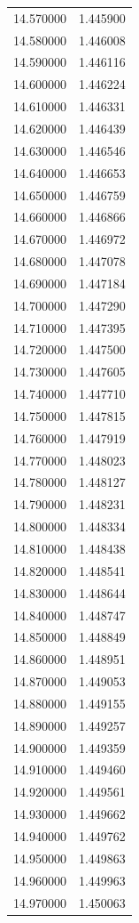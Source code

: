 \begin{tabular}{rr}
14.570000 & 1.445900 \\
14.580000 & 1.446008 \\
14.590000 & 1.446116 \\
14.600000 & 1.446224 \\
14.610000 & 1.446331 \\
14.620000 & 1.446439 \\
14.630000 & 1.446546 \\
14.640000 & 1.446653 \\
14.650000 & 1.446759 \\
14.660000 & 1.446866 \\
14.670000 & 1.446972 \\
14.680000 & 1.447078 \\
14.690000 & 1.447184 \\
14.700000 & 1.447290 \\
14.710000 & 1.447395 \\
14.720000 & 1.447500 \\
14.730000 & 1.447605 \\
14.740000 & 1.447710 \\
14.750000 & 1.447815 \\
14.760000 & 1.447919 \\
14.770000 & 1.448023 \\
14.780000 & 1.448127 \\
14.790000 & 1.448231 \\
14.800000 & 1.448334 \\
14.810000 & 1.448438 \\
14.820000 & 1.448541 \\
14.830000 & 1.448644 \\
14.840000 & 1.448747 \\
14.850000 & 1.448849 \\
14.860000 & 1.448951 \\
14.870000 & 1.449053 \\
14.880000 & 1.449155 \\
14.890000 & 1.449257 \\
14.900000 & 1.449359 \\
14.910000 & 1.449460 \\
14.920000 & 1.449561 \\
14.930000 & 1.449662 \\
14.940000 & 1.449762 \\
14.950000 & 1.449863 \\
14.960000 & 1.449963 \\
14.970000 & 1.450063 \\

\end{tabular}
